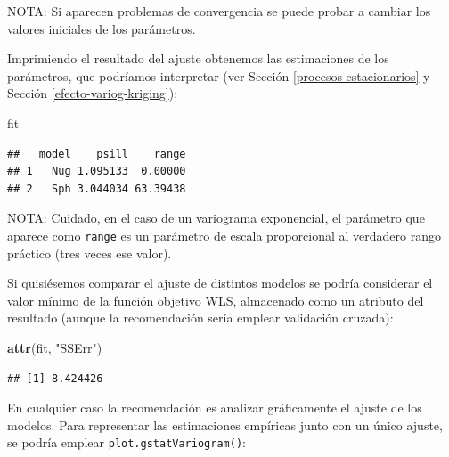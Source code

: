 \documentclass[
]{book}
\newenvironment{Shaded}{\begin{snugshade}}{\end{snugshade}}
\newcommand{\DecValTok}[1]{\textcolor[rgb]{0.00,0.00,0.81}{#1}}
\newcommand{\FunctionTok}[1]{\textcolor[rgb]{0.13,0.29,0.53}{\textbf{#1}}}
\newcommand{\NormalTok}[1]{#1}
\newcommand{\OtherTok}[1]{\textcolor[rgb]{0.56,0.35,0.01}{#1}}
\newcommand{\SpecialCharTok}[1]{\textcolor[rgb]{0.81,0.36,0.00}{\textbf{#1}}}
\newcommand{\StringTok}[1]{\textcolor[rgb]{0.31,0.60,0.02}{#1}}
\theoremstyle{break}
\theoremstyle{definition}
\theoremstyle{definition}
\theoremstyle{definition}
\theoremstyle{definition}
\theoremstyle{remark}
\begin{document}
NOTA: Si aparecen problemas de convergencia se puede probar a cambiar los valores iniciales de los parámetros.

Imprimiendo el resultado del ajuste obtenemos las estimaciones de los parámetros, que podríamos interpretar (ver Sección \ref{procesos-estacionarios} y Sección \ref{efecto-variog-kriging}):

\begin{Shaded}
\begin{Highlighting}[]
\NormalTok{fit}
\end{Highlighting}
\end{Shaded}

\begin{verbatim}
##   model    psill    range
## 1   Nug 1.095133  0.00000
## 2   Sph 3.044034 63.39438
\end{verbatim}

\begin{Shaded}
\end{Shaded}

NOTA: Cuidado, en el caso de un variograma exponencial, el parámetro que aparece como \texttt{range} es un parámetro de escala proporcional al verdadero rango práctico (tres veces ese valor).

Si quisiésemos comparar el ajuste de distintos modelos se podría considerar el valor mínimo de la función objetivo WLS, almacenado como un atributo del resultado (aunque la recomendación sería emplear validación cruzada):

\begin{Shaded}
\begin{Highlighting}[]
\FunctionTok{attr}\NormalTok{(fit, }\StringTok{"SSErr"}\NormalTok{)}
\end{Highlighting}
\end{Shaded}

\begin{verbatim}
## [1] 8.424426
\end{verbatim}

En cualquier caso la recomendación es analizar gráficamente el ajuste de los modelos.
Para representar las estimaciones empíricas junto con un único ajuste, se
podría emplear \texttt{plot.gstatVariogram()}:
\end{document}
